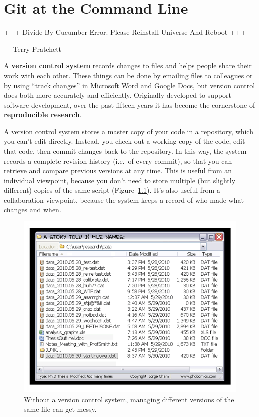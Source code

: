 \documentclass[
]{krantz}
\renewenvironment{quote}{\begin{VF}}{\end{VF}}
\newcommand{\gref}[2]{\hyperlink{#2}{\textbf{#1}}}
\begin{document}
\hypertarget{git-cmdline}{%
\chapter{Git at the Command Line}\label{git-cmdline}}

\begin{quote}
+++ Divide By Cucumber Error. Please Reinstall Universe And Reboot +++

--- Terry Pratchett
\end{quote}

A \gref{version control system}{version\_control\_system} records changes to files
and helps people share their work with each other.
These things can be done by emailing files to colleagues
or by using ``track changes'' in Microsoft Word and Google Docs,
but version control does both more accurately and efficiently.
Originally developed to support software development,
over the past fifteen years it has become the cornerstone
of \gref{reproducible research}{reproducible\_research}.

A version control system stores a master copy of your code in a repository,
which you can't edit directly.
Instead, you check out a working copy of the code,
edit that code, then commit changes back to the repository.
In this way, the system records a complete revision history (i.e.~of every commit),
so that you can retrieve and compare previous versions at any time.
This is useful from an individual viewpoint,
because you don't need to store multiple (but slightly different) copies of the same script
(Figure~\ref{fig:git-cmdline-phdcomics}).
It's also useful from a collaboration viewpoint,
because the system keeps a record of who made what changes and when.

\begin{figure}

{\centering \includegraphics[width=1\linewidth]{figures/git-cmdline/phd-comics} 

}

\caption{Without a version control system, managing different versions of the same file can get messy.}\label{fig:git-cmdline-phdcomics}
\end{figure}
\end{document}
